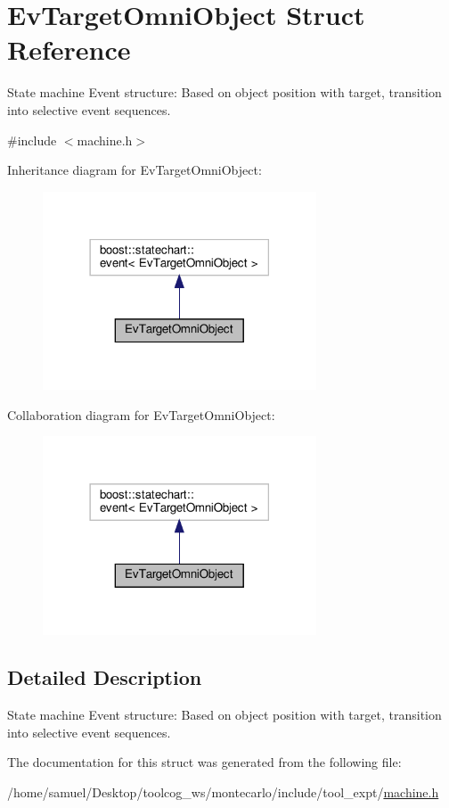 \hypertarget{structEvTargetOmniObject}{}\section{Ev\+Target\+Omni\+Object Struct Reference}
\label{structEvTargetOmniObject}


State machine Event structure\+: Based on object position with target, transition into selective event sequences.  




{\ttfamily \#include $<$machine.\+h$>$}



Inheritance diagram for Ev\+Target\+Omni\+Object\+:
\nopagebreak
\begin{figure}[H]
\begin{center}
\leavevmode
\includegraphics[width=230pt]{structEvTargetOmniObject__inherit__graph}
\end{center}
\end{figure}


Collaboration diagram for Ev\+Target\+Omni\+Object\+:
\nopagebreak
\begin{figure}[H]
\begin{center}
\leavevmode
\includegraphics[width=230pt]{structEvTargetOmniObject__coll__graph}
\end{center}
\end{figure}


\subsection{Detailed Description}
State machine Event structure\+: Based on object position with target, transition into selective event sequences. 

The documentation for this struct was generated from the following file\+:\begin{DoxyCompactItemize}
\item 
/home/samuel/\+Desktop/toolcog\+\_\+ws/montecarlo/include/tool\+\_\+expt/\hyperlink{machine_8h}{machine.\+h}\end{DoxyCompactItemize}
